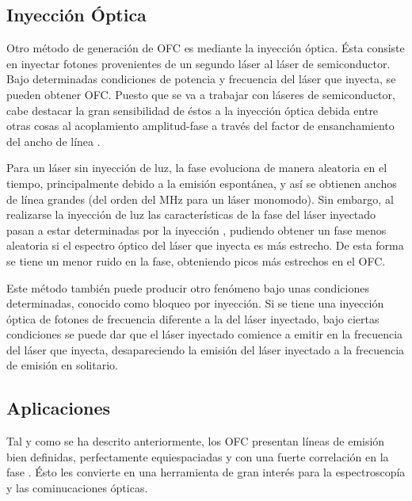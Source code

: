	\subsection{Inyección Óptica}

		Otro m\'etodo de generaci\'on de OFC es mediante la inyecci\'on \'optica. \'Esta consiste en inyectar fotones provenientes de un segundo l\'aser al l\'aser de semiconductor. Bajo determinadas condiciones de potencia y frecuencia del láser que inyecta, se pueden obtener OFC. Puesto que se va a trabajar con l\'aseres de semiconductor, cabe destacar la gran sensibilidad de \'estos a la inyecci\'on \'optica debida entre otras cosas al acoplamiento amplitud-fase a trav\'es del factor de ensanchamiento del ancho de l\'inea \cite{tfgPopp}.

		Para un l\'aser sin inyecci\'on de luz, la fase evoluciona de manera aleatoria en el tiempo, principalmente debido a la emisión espontánea, y as\'i se obtienen anchos de l\'inea grandes (del orden del MHz para un láser monomodo). Sin embargo, al realizarse la inyecci\'on de luz las caracter\'isticas de la fase del l\'aser inyectado pasan a estar determinadas por la inyecci\'on , pudiendo obtener un fase menos aleatoria si el espectro óptico del láser que inyecta es más estrecho. De esta forma se tiene un menor ruido en la fase, obteniendo picos m\'as estrechos en el OFC.

		Este m\'etodo tambi\'en puede producir otro fen\'omeno bajo unas condiciones determinadas, conocido como bloqueo por inyecci\'on. Si se tiene una inyecci\'on \'optica de fotones de frecuencia diferente a la del l\'aser inyectado, bajo ciertas condiciones se puede dar que el l\'aser inyectado comience a emitir en la frecuencia del l\'aser que inyecta, desapareciendo la emisi\'on del l\'aser inyectado a la frecuencia de emisión en solitario.

	\subsection{Aplicaciones}

		Tal y como se ha descrito anteriormente, los OFC presentan l\'ineas de emisi\'on bien definidas, perfectamente equiespaciadas y con una fuerte correlaci\'on en la fase \cite{desi2017development}. \'Esto les convierte en una herramienta de gran inter\'es para la espectroscop\'ia y las cominucaciones \'opticas.

